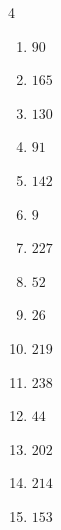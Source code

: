 \begin{multicols}{4}
\begin{enumerate}
  \item $90$


  \item $165$


  \item $130$


  \item $91$


  \item $142$


  \item $9$


  \item $227$


  \item $52$


  \item $26$


  \item $219$


  \item $238$


  \item $44$


\columnbreak %

\resetques

  \item $202$


  \item $214$


  \item $153$



\end{enumerate}
\end{multicols}
